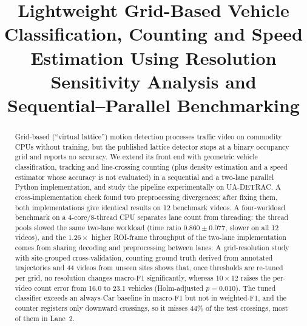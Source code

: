 \documentclass[conference]{IEEEtran}
\begin{document}
\title{Lightweight Grid-Based Vehicle Classification, Counting and Speed
Estimation Using Resolution Sensitivity Analysis and Sequential--Parallel
Benchmarking}

\author{
\and
{}
}

\maketitle

\begin{abstract}
Grid-based (``virtual lattice'') motion detection processes traffic video
on commodity CPUs without training, but the published lattice detector
stops at a binary occupancy grid and reports no accuracy. We extend its
front end with geometric vehicle classification, tracking and
line-crossing counting (plus density estimation and a speed estimator
whose accuracy is not evaluated) in a sequential and a two-lane parallel
Python implementation, and study the pipeline experimentally on UA-DETRAC.
A cross-implementation check found two preprocessing divergences; after
fixing them, both implementations give identical results on 12 benchmark
videos. A four-workload benchmark on a 4-core/8-thread CPU separates lane
count from threading: the thread pools slowed the same two-lane workload
(time ratio $0.860\pm0.077$, slower on all 12 videos), and the
$1.26\times$ higher ROI-frame throughput of the two-lane implementation
comes from sharing decoding and preprocessing between lanes. A
grid-resolution study with site-grouped cross-validation, counting ground
truth derived from annotated trajectories and 44 videos from unseen sites
shows that, once thresholds are re-tuned per grid, no resolution changes
macro-F1 significantly, whereas $10{\times}12$ raises the per-video count
error from 16.0 to 23.1 vehicles (Holm-adjusted $p=0.010$). The tuned
classifier exceeds an always-Car baseline in macro-F1 but not in
weighted-F1, and the counter registers only downward crossings, so it
misses 44\% of the test crossings, most of them in Lane~2.
\end{abstract}
\end{document}
